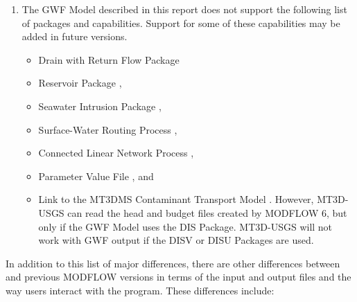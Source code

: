 \begin{enumerate}
\item The GWF Model described in this report does not support the following list of packages and capabilities.  Support for some of these capabilities may be added in future \mf versions.
  \begin{itemize}
    \item Drain with Return Flow Package \citep{modflowdrtpack}
    \item Reservoir Package \citep{fenske1996documentation},
    \item Seawater Intrusion Package \citep{bakker2013documentation},
    \item Surface-Water Routing Process \citep{hughes2012documentation},
    \item Connected Linear Network Process \citep{modflowusg},
    \item Parameter Value File \citep{modflow2005}, and
    \item Link to the MT3DMS Contaminant Transport Model \citep{zheng2001modflow}.  However, MT3D-USGS can read the head and budget files created by MODFLOW 6, but only if the GWF Model uses the DIS Package.  MT3D-USGS will not work with GWF output if the DISV or DISU Packages are used.
  \end{itemize}

\end{enumerate}

In addition to this list of major differences, there are other differences between \mf and previous MODFLOW versions in terms of the input and output files and the way users interact with the program.  These differences include:

